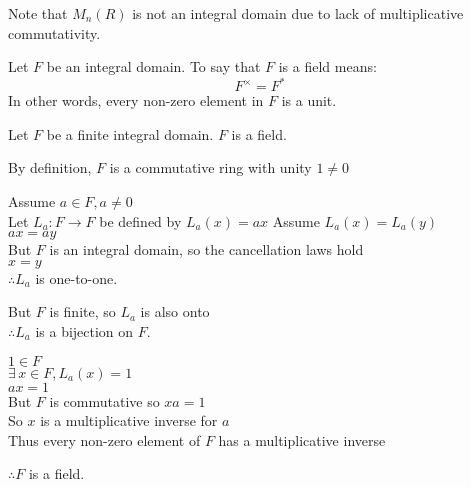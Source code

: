 \documentclass[letterpaper,12pt,fleqn]{article}
\begin{document}
Note that $M_n(R)$ is not an integral domain due to lack of multiplicative
commutativity.

\begin{definition}[Field]
  Let $F$ be an integral domain. To say that $F$ is a field means:
  \[F^{\times}=F^*\]
  In other words, every non-zero element in $F$ is a unit.
\end{definition}

\begin{theorem}
  Let $F$ be a finite integral domain. $F$ is a field.
\end{theorem}

\begin{theproof}
  By definition, $F$ is a commutative ring with unity $1\ne0$

  Assume $a\in F,a\ne0$ \\
  Let $L_a:F\to F$ be defined by $L_a(x)=ax$
\newpage
  Assume $L_a(x)=L_a(y)$ \\
  $ax=ay$ \\
  But $F$ is an integral domain, so the cancellation laws hold \\
  $x=y$ \\
  $\therefore L_a$ is one-to-one.

  But $F$ is finite, so $L_a$ is also onto \\
  $\therefore L_a$ is a bijection on $F$.

  $1\in F$ \\
  $\exists\,x\in F,L_a(x)=1$ \\
  $ax=1$ \\
  But $F$ is commutative so $xa=1$ \\
  So $x$ is a multiplicative inverse for $a$ \\
  Thus every non-zero element of $F$ has a multiplicative inverse

  $\therefore F$ is a field.
\end{theproof}
\end{document}
